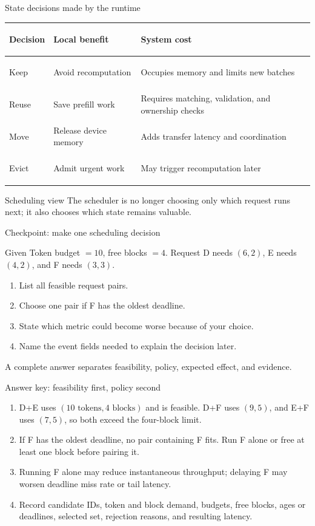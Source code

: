 \documentclass[aspectratio=169,11pt]{beamer}
\newcommand{\smallnote}[1]{\textcolor{HUSTGray}{\footnotesize #1}}
\begin{document}
\begin{frame}{State decisions made by the runtime}
  \small
  \begin{tabularx}{\textwidth}{>{\bfseries\raggedright\arraybackslash}p{2.1cm}YY}
    \toprule
    Decision & Local benefit & System cost \\
    \midrule
    Keep & Avoid recomputation & Occupies memory and limits new batches \\
    Reuse & Save prefill work & Requires matching, validation, and ownership checks \\
    Move & Release device memory & Adds transfer latency and coordination \\
    Evict & Admit urgent work & May trigger recomputation later \\
    \bottomrule
  \end{tabularx}
  \vspace{0.28cm}
  \begin{block}{Scheduling view}
    The scheduler is no longer choosing only which request runs next; it also chooses which state remains valuable.
  \end{block}
\end{frame}

\begin{frame}{Checkpoint: make one scheduling decision}
  \begin{block}{Given}
    Token budget \(=10\), free blocks \(=4\). Request D needs \((6,2)\), E needs \((4,2)\), and F needs \((3,3)\).
  \end{block}
  \begin{enumerate}
    \item List all feasible request pairs.
    \item Choose one pair if F has the oldest deadline.
    \item State which metric could become worse because of your choice.
    \item Name the event fields needed to explain the decision later.
  \end{enumerate}
  \smallnote{A complete answer separates feasibility, policy, expected effect, and evidence.}
\end{frame}

\begin{frame}{Answer key: feasibility first, policy second}
  \begin{enumerate}
    \item D+E uses \((10\text{ tokens},4\text{ blocks})\) and is feasible. D+F uses \((9,5)\), and E+F uses \((7,5)\), so both exceed the four-block limit.
    \item If F has the oldest deadline, no pair containing F fits. Run F alone or free at least one block before pairing it.
    \item Running F alone may reduce instantaneous throughput; delaying F may worsen deadline miss rate or tail latency.
    \item Record candidate IDs, token and block demand, budgets, free blocks, ages or deadlines, selected set, rejection reasons, and resulting latency.
  \end{enumerate}
\end{frame}
\end{document}
